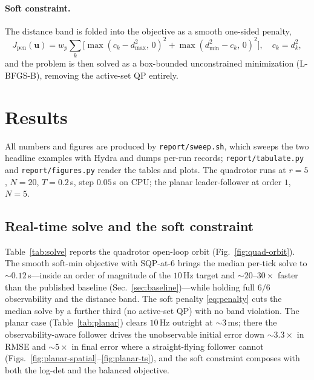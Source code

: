 \documentclass[11pt]{article}
\newcommand{\code}[1]{\texttt{\small #1}}
\begin{document}
\paragraph{Soft constraint.} The distance band is folded into the objective as a smooth one-sided
penalty,
\begin{equation}\label{eq:penalty}
  J_{\mathrm{pen}}(\bm{u}) = w_p \sum_k \Big[\max(c_k - d_{\max}^2,\,0)^2
  + \max(d_{\min}^2 - c_k,\,0)^2\Big], \quad c_k = d_k^2,
\end{equation}
and the problem is then solved as a box-bounded unconstrained minimization (L-BFGS-B), removing the
active-set QP entirely.

\section{Results}\label{sec:results}

All numbers and figures are produced by \code{report/sweep.sh}, which sweeps the two headline
examples with Hydra and dumps per-run records; \code{report/tabulate.py} and
\code{report/figures.py} render the tables and plots. The quadrotor runs at $r=5$, $N=20$,
$T=0.2$\,s, step $0.05$\,s on CPU; the planar leader-follower at order $1$, $N=5$.

\subsection{Real-time solve and the soft constraint}\label{sub:res-solve}
Table~\ref{tab:solve} reports the quadrotor open-loop orbit (Fig.~\ref{fig:quad-orbit}). The smooth
soft-min objective with SQP-at-6 brings the median per-tick solve to $\sim\!0.12$\,s---inside an
order of magnitude of the $10$\,Hz target and $\sim\!20$--$30\times$ faster than the published
baseline (Sec.~\ref{sec:baseline})---while holding full $6/6$ observability and the distance band.
The soft penalty \eqref{eq:penalty} cuts the median solve by a further third (no active-set QP)
with no band violation. The planar case (Table~\ref{tab:planar}) clears $10$\,Hz outright at
$\sim\!3$\,ms; there the observability-aware follower drives the unobservable initial error down
$\sim\!3.3\times$ in RMSE and $\sim\!5\times$ in final error where a straight-flying follower
cannot (Figs.~\ref{fig:planar-spatial}--\ref{fig:planar-ts}), and the soft constraint composes
with both the log-det and the balanced objective.
\end{document}
